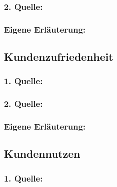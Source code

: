        \subsubsection*{2. Quelle:}
        \begin{abstract}
        \end{abstract}
        \subsubsection*{Eigene Erläuterung:}
        \begin{abstract}
        \end{abstract}
    \subsection{Kundenzufriedenheit}
        \subsubsection*{1. Quelle:}
        \begin{abstract}
        \end{abstract}
        \subsubsection*{2. Quelle:}
        \begin{abstract}
        \end{abstract}
        \subsubsection*{Eigene Erläuterung:}
        \begin{abstract}
        \end{abstract}
    \subsection{Kundennutzen}
        \subsubsection*{1. Quelle:}
        \begin{abstract}
        \end{abstract}
